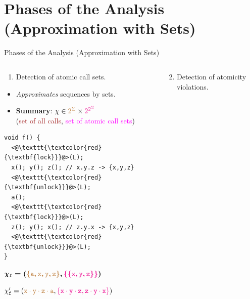\documentclass[10pt, xcolor=pdflatex, hyperref={unicode}, aspectratio=169]{beamer}
\begin{document}
\section{Phases of the Analysis (Approximation with Sets)}
\begin{frame}[fragile]{Phases of the Analysis (Approximation with Sets)}
    \begin{columns}
        \begin{column}[T]{.55 \linewidth}
            \begin{enumerate}
                \item Detection of \alert{atomic call sets}.
            \end{enumerate}

            \begin{itemize}
                \item \emph{Approximates} \alert{sequences by sets}.

                \item \textbf{Summary}: $ \chi \in \textcolor{brown}{2^\Sigma} \times \textcolor{magenta}{2^{2^\Sigma}} $ \\
                    (\textcolor{brown}{set of all calls}, \textcolor{magenta}{set of atomic call sets})
            \end{itemize}

\begin{lstlisting}
void f() {
  <@\texttt{\textcolor{red}{\textbf{lock}}}@>(L); 
  x(); y(); z(); // x.y.z -> {x,y,z}
  <@\texttt{\textcolor{red}{\textbf{unlock}}}@>(L);
  a();
  <@\texttt{\textcolor{red}{\textbf{lock}}}@>(L); 
  z(); y(); x(); // z.y.x -> {x,y,z}
  <@\texttt{\textcolor{red}{\textbf{unlock}}}@>(L);
}
\end{lstlisting}

            \centering
            \footnotesize

            $ \boldsymbol{\chi_\mathtt{f} = (\textcolor{brown}{\{\mathtt{a, x, y, z}\}}, \textcolor{magenta}{\{\{\mathtt{x, y, z}\}\}})} $
            
            \smallskip
            
            \textcolor{gray}{$ \chi_\mathtt{f}^\prime = (\textcolor{brown}{\mathtt{x \cdot y \cdot z \cdot a}}, \textcolor{magenta}{\{\mathtt{x \cdot y \cdot z}, \mathtt{z \cdot y \cdot x}\}}) $}
        \end{column}

        \begin{column}[T]{.45 \linewidth}
            \begin{enumerate}\setcounter{enumi}{1}
                \item Detection of \alert{atomicity violations}.
            \end{enumerate}


\end{column}
\end{columns}
\end{frame}
\end{document}
